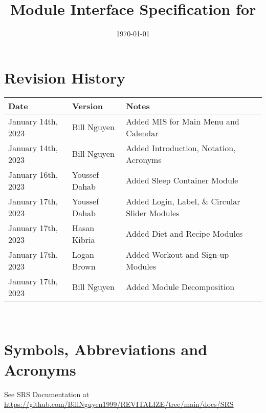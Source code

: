 \documentclass[12pt, titlepage]{article}
\begin{document}
\title{Module Interface Specification for \progname{}}

\author{\authname}

\date{\today}

\maketitle


\section{Revision History}

\begin{tabularx}{\textwidth}{p{3cm}p{2cm}X}
	\toprule {\bf Date} & {\bf Version} & {\bf Notes}\\
	\midrule
	January 14th, 2023 & Bill Nguyen  & Added MIS for Main Menu and Calendar\\
	January 14th, 2023 & Bill Nguyen  & Added Introduction, Notation, Acronyms\\
	January 16th, 2023 & Youssef Dahab & Added Sleep Container Module\\
	January 17th, 2023 & Youssef Dahab & Added Login, Label, \& Circular Slider Modules\\
	January 17th, 2023 & Hasan Kibria & Added Diet and Recipe Modules\\
	January 17th, 2023 & Logan Brown & Added Workout and Sign-up Modules\\
	January 17th, 2023 & Bill Nguyen  & Added Module Decomposition\\
	\bottomrule
\end{tabularx}

~\newpage

\section{Symbols, Abbreviations and Acronyms}

See SRS Documentation at \url{https://github.com/BillNguyen1999/REVITALIZE/tree/main/docs/SRS}
\end{document}
